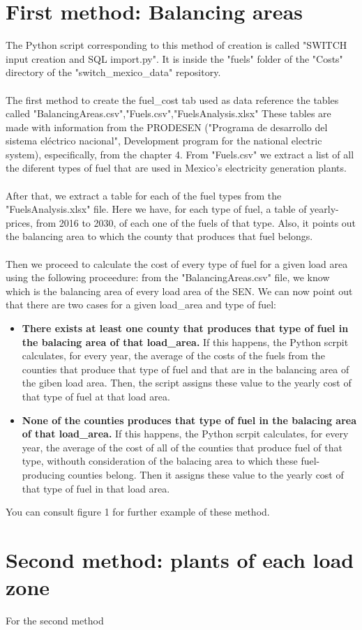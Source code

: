 \documentclass{article}
\begin{document}
\section{First method: Balancing areas}
The Python script corresponding to this method of creation is called "SWITCH input creation and SQL import.py". It is inside the "fuels" folder of the "Costs" directory of the "switch\_mexico\_data" repository.
\\
\\The first method to create the fuel\_cost tab used as data reference the tables called "BalancingAreas.csv","Fuels.csv","FuelsAnalysis.xlsx" These tables are made with information from the PRODESEN ("Programa de desarrollo del sistema eléctrico nacional", Development program for the national electric system), especifically, from the chapter 4. From "Fuels.csv" we extract a list of all the diferent types of fuel that are used in Mexico's electricity generation plants.
\\
\\After that, we extract a table for each of the fuel types from the "FuelsAnalysis.xlsx" file. Here we have, for each type of fuel, a table of yearly-prices, from 2016 to 2030, of each one of the fuels of that type. Also, it points out the balancing area to which the county that produces that fuel belongs.
\\
\\Then we proceed to calculate the cost of every type of fuel for a given load area using the following proceedure: from the "BalancingAreas.csv" file, we know which is the balancing area of every load area of the SEN. We can now point out that there are two cases for a given load_area and type of fuel:
\begin{itemize}
\item \textbf{There exists at least one county that produces that type of fuel in the balacing area of that load_area.} If this happens, the Python scrpit calculates, for every year, the average of the costs of the fuels from the counties that produce that type of fuel and that are in the balancing area of the giben load area. Then, the script assigns these value to the yearly cost of that type of fuel at that load area.
\item \textbf{None of the counties produces that type of fuel in the balacing area of that load_area.} If this happens, the Python scrpit calculates, for every year, the average of the cost of all of the counties that produce fuel of that type, withouth consideration of the balacing area to which these fuel-producing counties belong. Then it assigns these value to the yearly cost of that type of fuel in that load area.
\end{itemize}
You can consult figure 1 for further example of these method.
\section{Second method: plants of each load zone}
For the second method
\end{document}
